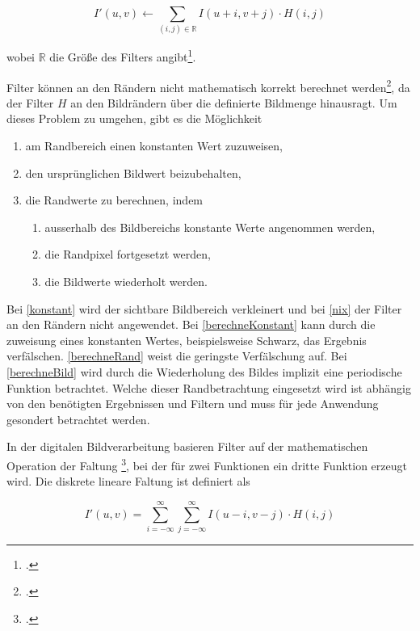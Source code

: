 \begin{equation}
	I'\left(u,v\right) \gets
	\sum_{\left(i,j\right)\in\mathbb{R}} I\left(u + i, v + j\right) \cdot H\left(i,j\right)
\end{equation}

wobei $\mathbb{R}$ die Größe des Filters angibt\footcite[Vgl.][S.~92--93]{burger05}.

Filter können an den Rändern nicht mathematisch korrekt berechnet werden\footcite[Vgl.][S.~113]{burger05}, da der Filter $H$ an den Bildrändern über die definierte Bildmenge hinausragt. Um dieses Problem zu umgehen, gibt es die Möglichkeit

\begin{enumerate}
	\item am Randbereich einen konstanten Wert zuzuweisen,\label{konstant}
	\item den ursprünglichen Bildwert beizubehalten,\label{nix}
	\item die Randwerte zu berechnen, indem
	\begin{enumerate}
		\item ausserhalb des Bildbereichs konstante Werte angenommen werden,\label{berechneKonstant}
		\item die Randpixel fortgesetzt werden,\label{berechneRand}
		\item die Bildwerte wiederholt werden.\label{berechneBild}
	\end{enumerate}
\end{enumerate}

Bei \autoref{konstant} wird der sichtbare Bildbereich verkleinert und bei \autoref{nix} der Filter an den Rändern nicht
 angewendet. Bei \autoref{berechneKonstant} kann durch die zuweisung eines konstanten Wertes, beispielsweise Schwarz,
 das Ergebnis verfälschen. \autoref{berechneRand} weist die geringste Verfälschung auf. Bei \autoref{berechneBild} wird
 durch die Wiederholung des Bildes implizit eine periodische Funktion betrachtet. Welche dieser Randbetrachtung
 eingesetzt wird ist abhängig von den benötigten Ergebnissen und Filtern und muss für jede Anwendung gesondert
 betrachtet werden.

In der digitalen Bildverarbeitung basieren Filter auf der mathematischen Operation der Faltung
\footcite[Vgl.][S.~101--104]{burger05}, bei der für zwei Funktionen ein dritte Funktion erzeugt wird. Die diskrete
 lineare Faltung ist definiert als

\begin{equation}
	I'\left(u,v\right) =
	\sum \limits_{i = -\infty}^{\infty}
	\sum \limits_{j = -\infty}^{\infty}
	I\left(u - i, v - j\right) \cdot H\left(i,j\right)
\end{equation}

